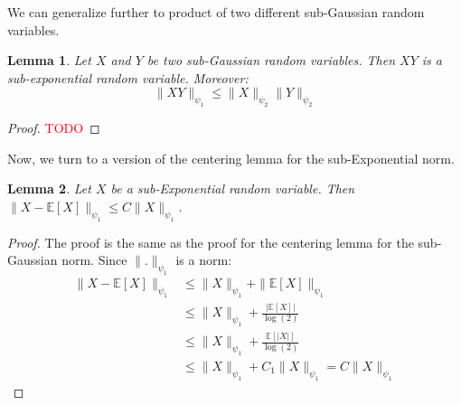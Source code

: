 \documentclass{article}
\newtheorem{lemma}{Lemma}[subsection]
\theoremstyle{remark}
\newcommand{\Exp}{\mathbb{E}}
\newcommand{\TODO}{\textcolor{red}{TODO}}
\begin{document}
We can generalize further to product of two different sub-Gaussian random variables.
\begin{lemma}
Let \(X\) and \(Y\) be two sub-Gaussian random variables. Then \(XY\) is a sub-exponential random variable. Moreover:
\begin{equation*}
\|XY\|_{\psi_{1}} \leq \|X\|_{\psi_{2}} \|Y\|_{\psi_{2}}
\end{equation*}
\end{lemma}

\begin{proof}
\TODO

\end{proof}

Now, we turn to a version of the centering lemma for the sub-Exponential norm.
\begin{lemma}
Let \(X\) be a sub-Exponential random variable. Then \(\|X - \Exp[X]\|_{\psi_{1}} \leq C\|X\|_{\psi_{1}}\).
\end{lemma}

\begin{proof}
The proof is the same as the proof for the centering lemma for the sub-Gaussian norm. Since \(\|.\|_{\psi_{1}}\) is a norm:
\begin{align*}
\|X - \Exp[X]\|_{\psi_{1}} &\leq \|X\|_{\psi_{1}} + \|\Exp[X]\|_{\psi_{1}} \\
&\leq \|X\|_{\psi_{1}} + \frac{|\Exp[X]|}{\log(2)} \\
&\leq \|X\|_{\psi_{1}} + \frac{\Exp[|X|]}{\log(2)} \\
&\leq \|X\|_{\psi_{1}} + C_{1}\|X\|_{\psi_{1}} = C\|X\|_{\psi_{1}}
\end{align*}
\end{proof}
\end{document}
